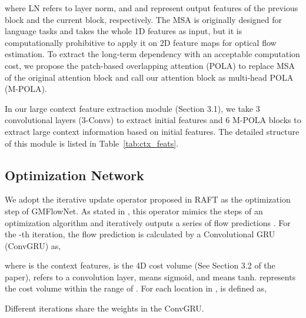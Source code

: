 \documentclass[10pt,twocolumn,letterpaper]{article}
\begin{document}
where LN refers to layer norm, and  and  represent output features of the previous block and the current block, respectively.
The MSA is originally designed for language tasks and takes the whole 1D features as input, but it is computationally prohibitive to apply it on 2D feature maps for optical flow estimation. 
To extract the long-term dependency with an acceptable computation cost, we propose the patch-based overlapping attention (POLA) to replace MSA of the original attention block and call our attention block as multi-head POLA (M-POLA).

In our large context feature extraction module (Section 3.1), we take 3 convolutional layers (3-Convs) to extract initial features and 6 M-POLA blocks to extract large context information based on initial features. The detailed structure of this module is listed in Table~\ref{tab:ctx_feats}. 




\subsection{Optimization Network}

We adopt the iterative update operator proposed in RAFT \cite{teed2020raft} as the optimization step of GMFlowNet. As stated in \cite{teed2020raft}, this operator mimics the steps of an optimization algorithm and iteratively outputs a series of flow predictions .
For the -th iteration, the flow prediction  is calculated by a Convolutional GRU \cite{cho2014properties} (ConvGRU) as,

where  is the context features,  is the 4D cost volume (See Section 3.2 of the paper),  refers to a convolution layer,  means sigmoid, and  means tanh.  represents the cost volume within the range of . For each location  in ,  is defined as,

Different iterations share the weights in the ConvGRU.
\end{document}
